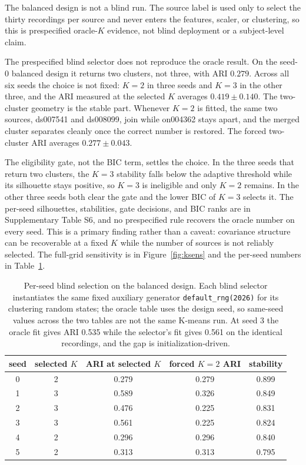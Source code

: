 The balanced design is not a blind run. The source label is used only to
select the thirty recordings per source and never enters the features,
scaler, or clustering, so this is prespecified oracle-\(K\) evidence,
not blind deployment or a subject-level claim.

The prespecified blind selector does not reproduce the oracle result. On
the seed-0 balanced design it returns two clusters, not three, with ARI
\(0.279\). Across all six seeds the choice is not fixed: \(K=2\) in
three seeds and \(K=3\) in the other three, and the ARI measured at the
selected \(K\) averages \(0.419\pm0.140\). The two-cluster geometry is
the stable part. Whenever \(K=2\) is fitted, the same two sources,
ds007541 and ds008099, join while on004362 stays apart, and the merged
cluster separates cleanly once the correct number is restored. The
forced two-cluster ARI averages \(0.277\pm0.043\).

The eligibility gate, not the BIC term, settles the choice. In the three
seeds that return two clusters, the \(K=3\) stability falls below the
adaptive threshold while its silhouette stays positive, so \(K=3\) is
ineligible and only \(K=2\) remains. In the other three seeds both clear
the gate and the lower BIC of \(K=3\) selects it. The per-seed
silhouettes, stabilities, gate decisions, and BIC ranks are in
Supplementary Table S6, and no prespecified rule recovers the oracle
number on every seed. This is a primary finding rather than a caveat:
covariance structure can be recoverable at a fixed \(K\) while the
number of sources is not reliably selected. The full-grid sensitivity is
in Figure~\ref{fig:ksens} and the per-seed numbers in
Table~\ref{tab:blind}.

\begin{table}[htbp]
\centering
\small
\caption{Per-seed blind selection on the balanced design. Each blind selector instantiates the same fixed auxiliary generator \texttt{default\_rng(2026)} for its clustering random states; the oracle table uses the design seed, so same-seed values across the two tables are not the same K-means run. At seed 3 the oracle fit gives ARI 0.535 while the selector's fit gives 0.561 on the identical recordings, and the gap is initialization-driven.}
\label{tab:blind}
\begin{tabular}{ccccc}
\hline
seed & selected $K$ & ARI at selected $K$ & forced $K=2$ ARI & stability\\
\hline
0 & 2 & 0.279 & 0.279 & 0.899\\
1 & 3 & 0.589 & 0.326 & 0.849\\
2 & 3 & 0.476 & 0.225 & 0.831\\
3 & 3 & 0.561 & 0.225 & 0.824\\
4 & 2 & 0.296 & 0.296 & 0.840\\
5 & 2 & 0.313 & 0.313 & 0.795\\
\hline
\end{tabular}

\end{table}

